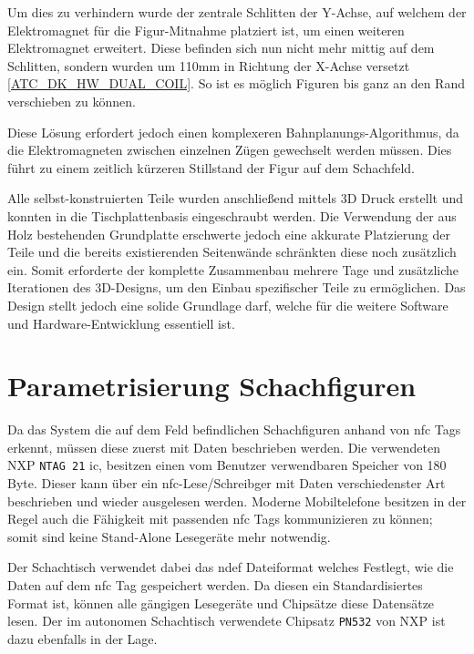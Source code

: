 Um dies zu verhindern wurde der zentrale Schlitten der Y-Achse, auf
welchem der Elektromagnet für die Figur-Mitnahme platziert ist, um einen
weiteren Elektromagnet erweitert. Diese befinden sich nun nicht mehr
mittig auf dem Schlitten, sondern wurden um 110mm in Richtung der
X-Achse versetzt \ref{ATC_DK_HW_DUAL_COIL}. So ist es möglich Figuren
bis ganz an den Rand verschieben zu können.

Diese Lösung erfordert jedoch einen komplexeren
Bahnplanungs-Algorithmus, da die Elektromagneten zwischen einzelnen
Zügen gewechselt werden müssen. Dies führt zu einem zeitlich kürzeren
Stillstand der Figur auf dem Schachfeld.

Alle selbst-konstruierten Teile wurden anschließend mittels 3D Druck
erstellt und konnten in die Tischplattenbasis eingeschraubt werden. Die
Verwendung der aus Holz bestehenden Grundplatte erschwerte jedoch eine
akkurate Platzierung der Teile und die bereits existierenden Seitenwände
schränkten diese noch zusätzlich ein. Somit erforderte der komplette
Zusammenbau mehrere Tage und zusätzliche Iterationen des 3D-Designs, um
den Einbau spezifischer Teile zu ermöglichen. Das Design stellt jedoch
eine solide Grundlage darf, welche für die weitere Software und
Hardware-Entwicklung essentiell ist.

\hypertarget{parametrisierung-schachfiguren}{%
\section{Parametrisierung
Schachfiguren}\label{parametrisierung-schachfiguren}}

Da das System die auf dem Feld befindlichen Schachfiguren anhand von
\gls{nfc} Tags erkennt, müssen diese zuerst mit Daten beschrieben
werden. Die verwendeten NXP
\passthrough{\lstinline!NTAG 21!}\cite{nxpntag21} \gls{ic}, besitzen
einen vom Benutzer verwendbaren Speicher von 180 Byte. Dieser kann über
ein \gls{nfc}-Lese/Schreibger mit Daten verschiedenster Art beschrieben
und wieder ausgelesen werden. Moderne Mobiltelefone besitzen in der
Regel auch die Fähigkeit mit passenden \gls{nfc} Tags kommunizieren zu
können; somit sind keine Stand-Alone Lesegeräte mehr notwendig.

Der Schachtisch verwendet dabei das \gls{ndef} Dateiformat welches
Festlegt, wie die Daten auf dem \gls{nfc} Tag gespeichert werden. Da
diesen ein Standardisiertes Format ist, können alle gängigen Lesegeräte
und Chipsätze diese Datensätze lesen. Der im autonomen Schachtisch
verwendete Chipsatz \passthrough{\lstinline!PN532!} von NXP ist dazu
ebenfalls in der Lage.

